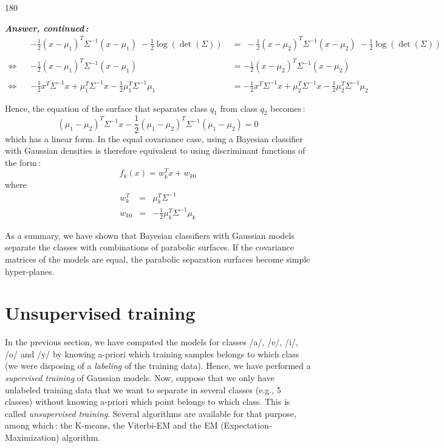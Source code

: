 \documentclass[twoside,a4paper,titlepage]{article}
\newcommand{\expl}[1]{%
\begin{turn}{180}%
\parbox{\textwidth}{\em #1}%
\end{turn}%
}
\newcommand{\tab}{\hspace{1em}}
\begin{document}
\expl{
{\bf Answer, continued\,:}
\begin{align*}
& & - \frac{1}{2} (x-\mu_1)^T \Sigma^{-1} (x-\mu_1)
\; - \frac{1}{2} \log \left( \det\left(\Sigma\right) \right)
\; & =
\; - \frac{1}{2} (x-\mu_2)^T \Sigma^{-1} (x-\mu_2)
\; - \frac{1}{2} \log \left( \det\left(\Sigma\right) \right)
\\
\\
\Leftrightarrow & &
- \frac{1}{2} (x-\mu_1)^T \Sigma^{-1} (x-\mu_1)
 & =
- \frac{1}{2} (x-\mu_2)^T \Sigma^{-1} (x-\mu_2)
\\
\\
\Leftrightarrow & &
- \frac{1}{2} x^T \Sigma^{-1} x
+ \mu_1^T \Sigma^{-1} x
- \frac{1}{2} \mu_1^T \Sigma^{-1} \mu_1
& =
- \frac{1}{2} x^T \Sigma^{-1} x
+ \mu_2^T \Sigma^{-1} x
- \frac{1}{2} \mu_2^T \Sigma^{-1} \mu_2
\end{align*}

\medskip
Hence, the equation of the surface that separates class $q_1$ from class
$q_2$ becomes\,:
\[
( \mu_1 - \mu_2 )^T \Sigma^{-1} x
- \frac{1}{2} ( \mu_1 - \mu_2 )^T \Sigma^{-1} ( \mu_1 - \mu_2 )
= 0
\]
which has a linear form. In the equal covariance case, using a Bayesian
classifier with Gaussian densities is therefore equivalent to using
discriminant functions of the form\,:
\[
f_k(x) = w_k^T x + w_{k0}
\]
where
\begin{eqnarray}
w_k^T  & = & \mu_k^T \Sigma^{-1}\nonumber \\
w_{k0} & = & - \frac{1}{2} \mu_k^T \Sigma^{-1} \mu_k \nonumber
\end{eqnarray}

\tab As a summary, we have shown that Bayesian classifiers with Gaussian
models separate the classes with combinations of parabolic surfaces. If the
covariance matrices of the models are equal, the parabolic separation
surfaces become simple hyper-planes.

}

\bigskip
\section{Unsupervised training}
\label{unsup}
In the previous section, we have computed the models for classes /a/, /e/,
/i/, /o/ and /y/ by knowing a-priori which training samples belongs to
which class (we were disposing of a {\em labeling} of the training
data). Hence, we have performed a {\em supervised training} of Gaussian
models.  Now, suppose that we only have unlabeled training data that we
want to separate in several classes (e.g., 5 classes) without knowing
a-priori which point belongs to which class. This is called {\em
unsupervised training}. Several algorithms are available for that purpose,
among which\,: the K-means, the Viterbi-EM and the EM
(Expectation-Maximization) algorithm.
\end{document}
